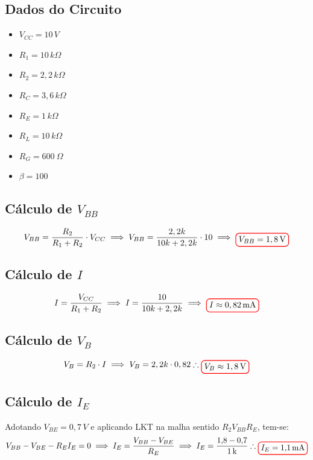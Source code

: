 \documentclass[12pt,openany,oneside,a4paper]{abntex2}
\begin{document}
\subsection{Dados do Circuito}
\begin{itemize}
    \item $V_{CC} = 10\,V$ 
    \item $R_{1} = 10\,{k}\Omega$ 
    \item $R_{2} = 2,2\,{k}\Omega$
    \item $R_{C} = 3,6\,{k}\Omega$
    \item $R_{E} = 1\,{k}\Omega$
    \item $R_{L} = 10\,{k}\Omega$
    \item $R_{G} = 600 \ \Omega$
    \item $\beta = 100$
\end{itemize}
    
\subsection{Cálculo de $V_{BB}$}
\[
V_{BB} = \frac{R_{2}}{R_{1} + R_{2}} \cdot V_{CC}
\implies
V_{BB} = \frac{2,2k}{10k + 2,2k} \cdot 10
\implies
\tikz[baseline]{\node[draw=red, thick, rounded corners] {$V_{BB} = 1,8\,\text{V}$};}
\]

\subsection{Cálculo de $I$}
\[
I = \frac{V_{CC}}{R_{1} + R_{2}} \implies
I = \frac{10}{10k + 2,2k} \implies
\tikz[baseline]{\node[draw=red, thick, rounded corners] {$I \approx 0,82\,\text{mA}$};}
\]

\subsection{Cálculo de $V_{B}$}
\[
V_{B} = R_{2} \cdot I \implies V_{B} = 2,2k \cdot 0,82 \therefore \tikz[baseline]{\node[draw=red, thick, rounded corners] {$V_{B} \approx 1,8\,\text{V}$};}
\]

\subsection{Cálculo de $I_{E}$}
Adotando $V_{BE} = 0,7\,V$ e aplicando LKT na malha sentido $R_{2}$$V_{BB}$$R_{E}$, tem-se:
\[
V_{BB} - V_{BE} - R_{E}I_{E} = 0 
\implies 
I_{E} = \frac{V_{BB} - V_{BE}}{R_{E}} 
\implies 
I_{E} = \frac{1{,}8 - 0{,}7}{1\,\text{k}} 
\therefore 
\tikz[baseline]{\node[draw=red, thick, rounded corners] {$I_{E} = 1{,}1\,\text{mA}$};}
\]
\end{document}
